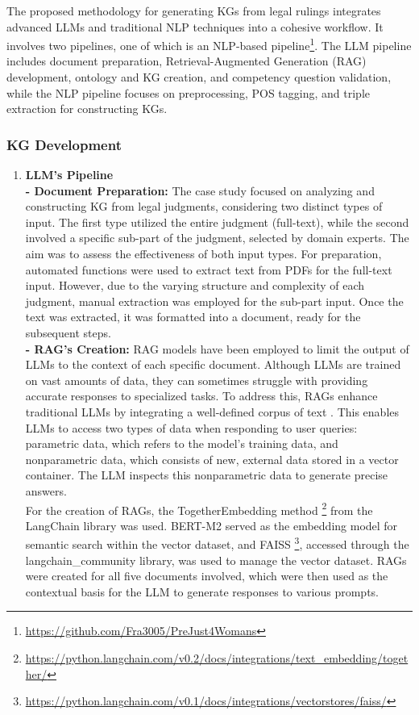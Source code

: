 \documentclass[runningheads]{llncs}
\begin{document}
The proposed methodology for generating KGs from legal rulings integrates advanced LLMs and traditional NLP techniques into a cohesive workflow. It involves two pipelines, one of which is an NLP-based pipeline\footnote{\url{https://github.com/Fra3005/PreJust4Womans}}. The LLM pipeline includes document preparation, Retrieval-Augmented Generation (RAG) development, ontology and KG creation, and competency question validation, while the NLP pipeline focuses on preprocessing, POS tagging, and triple extraction for constructing KGs.
\subsubsection{KG Development}
\begin{enumerate}
\item \textbf{LLM's Pipeline}\\
\textbf{- Document Preparation:} The case study focused on analyzing and constructing KG from legal judgments, considering two distinct types of input. The first type utilized the entire judgment (full-text), while the second involved a specific sub-part of the judgment, selected by domain experts. The aim was to assess the effectiveness of both input types. For preparation, automated functions were used to extract text from PDFs for the full-text input. However, due to the varying structure and complexity of each judgment, manual extraction was employed for the sub-part input. Once the text was extracted, it was formatted into a document, ready for the subsequent steps.\\
\textbf{- RAG's Creation:} RAG models have been employed to limit the output of LLMs to the context of each specific document. Although LLMs are trained on vast amounts of data, they can sometimes struggle with providing accurate responses to specialized tasks. To address this, RAGs enhance traditional LLMs by integrating a well-defined corpus of text \cite{lewis2020retrieval}. This enables LLMs to access two types of data when responding to user queries: parametric data, which refers to the model's training data, and nonparametric data, which consists of new, external data stored in a vector container. The LLM inspects this nonparametric data to generate precise answers.\\
For the creation of RAGs, the TogetherEmbedding method \footnote{\url{https://python.langchain.com/v0.2/docs/integrations/text\_embedding/together/}} from the LangChain library was used. BERT-M2 served as the embedding model for semantic search within the vector dataset, and FAISS \footnote{\url{https://python.langchain.com/v0.1/docs/integrations/vectorstores/faiss/}}, accessed through the langchain\_community library, was used to manage the vector dataset. RAGs were created for all five documents involved, which were then used as the contextual basis for the LLM to generate responses to various prompts.

\end{enumerate}
\end{document}
